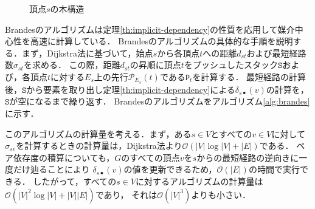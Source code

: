 \begin{figure}[tb]
  \centering
  \def\svgwidth{.35\linewidth}
  
  \caption{頂点$s$の木構造}
  \label{fig:implicit-dependency-2}
\end{figure}

Brandesのアルゴリズムは定理\ref{th:implicit-dependency}の性質を応用して媒介中心性を高速に計算している．
Brandesのアルゴリズムの具体的な手順を説明する．まず，Dijkstra法に基づいて，始点$s$から各頂点$t$への距離$d_{st}$および最短経路数$\sigma_{st}$を求める．
この際，距離$d_{st}$の昇順に頂点$t$をプッシュしたスタック$\texttt{S}$および，各頂点$t$に対する$E_{s}$上の先行$\mathcal{P}_{E_s}(t)$である$\texttt{P}_t$を計算する．
最短経路の計算後，$\texttt{S}$から要素を取り出し定理\ref{th:implicit-dependency}による$\delta_{s\bullet}(v)$の計算を，$\texttt{S}$が空になるまで繰り返す．
Brandesのアルゴリズムをアルゴリズム\ref{alg:brandes}に示す．

このアルゴリズムの計算量を考える．まず，ある$s\in V$とすべての$v\in V$に対して
$\sigma_{sv}$を計算するときの計算量は，Dijkstra法より$\mathcal{O}(|V|\log |V|+|E|)$である．
ペア依存度の積算についても，$G$のすべての頂点$v$を$s$からの最短経路の逆向きに一度だけ辿ることにより
$\delta_{s\bullet}(v)$の値を更新できるため，$\mathcal{O}(|E|)$の時間で実行できる\cite{Brandes2001}．
したがって，すべての$s\in V$に対するアルゴリズムの計算量は$\mathcal{O}(|V|^2\log |V|+|V||E|)$であり，
それは$\mathcal{O}(|V|^3)$よりも小さい．

